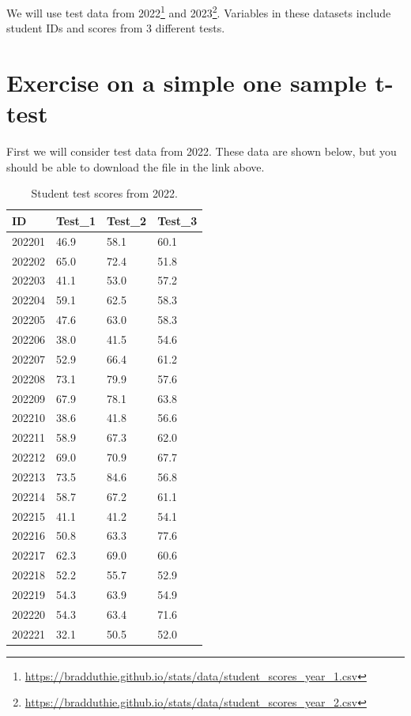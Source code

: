 \documentclass[
]{scrbook}
\begin{document}
We will use test data from 2022\footnote{\url{https://bradduthie.github.io/stats/data/student_scores_year_1.csv}} and 2023\footnote{\url{https://bradduthie.github.io/stats/data/student_scores_year_2.csv}}.
Variables in these datasets include student IDs and scores from 3 different tests.

\hypertarget{exercise-on-a-simple-one-sample-t-test}{%
\section{Exercise on a simple one sample t-test}\label{exercise-on-a-simple-one-sample-t-test}}

First we will consider test data from 2022.
These data are shown below, but you should be able to download the file in the link above.

\begin{table}

\caption{\label{tab:unnamed-chunk-101}Student test scores from 2022.}
\centering
\begin{tabular}[t]{l|l|l|l}
\hline
ID & Test\_1 & Test\_2 & Test\_3\\
\hline
202201 & 46.9 & 58.1 & 60.1\\
\hline
202202 & 65.0 & 72.4 & 51.8\\
\hline
202203 & 41.1 & 53.0 & 57.2\\
\hline
202204 & 59.1 & 62.5 & 58.3\\
\hline
202205 & 47.6 & 63.0 & 58.3\\
\hline
202206 & 38.0 & 41.5 & 54.6\\
\hline
202207 & 52.9 & 66.4 & 61.2\\
\hline
202208 & 73.1 & 79.9 & 57.6\\
\hline
202209 & 67.9 & 78.1 & 63.8\\
\hline
202210 & 38.6 & 41.8 & 56.6\\
\hline
202211 & 58.9 & 67.3 & 62.0\\
\hline
202212 & 69.0 & 70.9 & 67.7\\
\hline
202213 & 73.5 & 84.6 & 56.8\\
\hline
202214 & 58.7 & 67.2 & 61.1\\
\hline
202215 & 41.1 & 41.2 & 54.1\\
\hline
202216 & 50.8 & 63.3 & 77.6\\
\hline
202217 & 62.3 & 69.0 & 60.6\\
\hline
202218 & 52.2 & 55.7 & 52.9\\
\hline
202219 & 54.3 & 63.9 & 54.9\\
\hline
202220 & 54.3 & 63.4 & 71.6\\
\hline
202221 & 32.1 & 50.5 & 52.0\\
\hline
\end{tabular}
\end{table}
\end{document}
